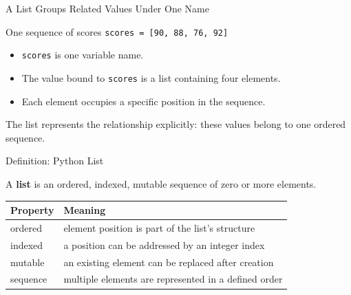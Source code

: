 \documentclass[aspectratio=169,10pt]{beamer}
\begin{document}
\begin{frame}{A List Groups Related Values Under One Name}
  \begin{block}{One sequence of scores}
    \centering
    \Large\texttt{scores = [90, 88, 76, 92]}
  \end{block}

  \begin{itemize}
    \item \texttt{scores} is one variable name.
    \item The value bound to \texttt{scores} is a list containing four elements.
    \item Each element occupies a specific position in the sequence.
  \end{itemize}

  \begin{keyidea}
    The list represents the relationship explicitly: these values belong to one ordered sequence.
  \end{keyidea}
\end{frame}

\begin{frame}{Definition: Python List}
  \begin{cpdefinition}
    A \textbf{list} is an ordered, indexed, mutable sequence of zero or more elements.
  \end{cpdefinition}

  \begin{center}
    \renewcommand{\arraystretch}{1.35}
    \begin{tabular}{l|l}
      \textbf{Property} & \textbf{Meaning} \\\hline
      ordered & element position is part of the list's structure \\
      indexed & a position can be addressed by an integer index \\
      mutable & an existing element can be replaced after creation \\
      sequence & multiple elements are represented in a defined order
    \end{tabular}
  \end{center}
\end{frame}
\end{document}
